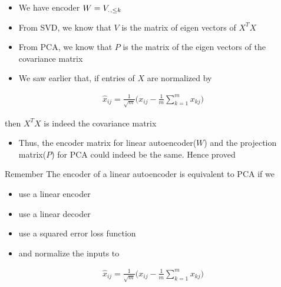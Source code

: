 \begin{frame}
    \begin{overlayarea}{\textwidth}{\textheight}
        \begin{itemize}\justifying
            \item<1-> We have encoder $W=V_{.\hspace{0.01in},\leq k}$
            \item<2-> From SVD, we know that $V$ is the matrix of eigen vectors of $X^TX$
            \item<3-> From PCA, we know that $P$ is the matrix of the eigen vectors of the covariance matrix
            \item<4-> We saw earlier that, if entries of $X$ are normalized by
        \end{itemize}
        {
            \begin{align*}
                         \hat{x}_{ij} = \frac{1}{\sqrt{m}}\Bigg(x_{ij}-\frac{1}{m}\sum\limits_{k=1}^mx_{kj}\Bigg) 
            \end{align*}
            
        }
        {
            then $X^TX$ is indeed the covariance matrix
        }
        \begin{itemize}
            \item<7-> Thus, the encoder matrix for linear autoencoder($W$) and the projection matrix($P$) for PCA could indeed be the same. Hence proved
        \end{itemize}
    \end{overlayarea}
\end{frame}

\begin{frame}

    \begin{block}{Remember}
        The encoder of a linear autoencoder is equivalent to PCA if we 
        \begin{itemize}\justifying
            \item<2-> use a linear encoder
            \item<3-> use a linear decoder
            \item<4-> use a squared error loss function
            \item<5-> and normalize the inputs to 
        \end{itemize}
        {
            \begin{align*}
                         \hat{x}_{ij} = \frac{1}{\sqrt{m}}\Bigg(x_{ij}-\frac{1}{m}\sum\limits_{k=1}^mx_{kj}\Bigg) 
            \end{align*}            
        }
    \end{block}
\end{frame}
